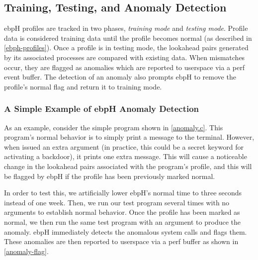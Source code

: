 \documentclass[
  12pt]{findlay}
\begin{document}
\hypertarget{training-testing-and-anomaly-detection}{%
\subsection{Training, Testing, and Anomaly
Detection}\label{training-testing-and-anomaly-detection}}

ebpH profiles are tracked in two phases, \emph{training mode} and
\emph{testing mode}. Profile data is considered training data until the
profile becomes normal (as described in \autoref{ebph-profiles}). Once a
profile is in testing mode, the lookahead pairs generated by its
associated processes are compared with existing data. When mismatches
occur, they are flagged as anomalies which are reported to userspace via
a perf event buffer. The detection of an anomaly also prompts ebpH to
remove the profile's normal flag and return it to training mode.

\hypertarget{a-simple-example-of-ebph-anomaly-detection}{%
\subsubsection{A Simple Example of ebpH Anomaly
Detection}\label{a-simple-example-of-ebph-anomaly-detection}}

As an example, consider the simple program shown in \autoref{anomaly.c}.
This program's normal behavior is to simply print a message to the
terminal. However, when issued an extra argument (in practice, this
could be a secret keyword for activating a backdoor), it prints one
extra message. This will cause a noticeable change in the lookahead
pairs associated with the program's profile, and this will be flagged by
ebpH if the profile has been previously marked normal.

\protect\enlargethispage*{\baselineskip}


In order to test this, we artificially lower ebpH's normal time to three
seconds instead of one week. Then, we run our test program several times
with no arguments to establish normal behavior. Once the profile has
been marked as normal, we then run the same test program with an
argument to produce the anomaly. ebpH immediately detects the anomalous
system calls and flags them. These anomalies are then reported to
userspace via a perf buffer as shown in \autoref{anomaly-flag}.
\end{document}
